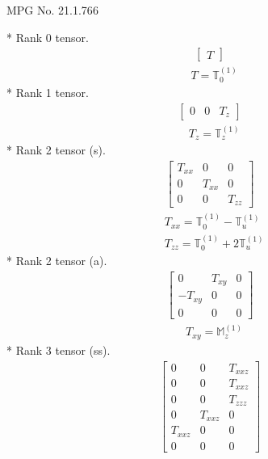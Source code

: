 \documentclass[fleqn,8pt,landscape]{jsarticle}
\begin{document}
\setcounter{MaxMatrixCols}{32}

\renewcommand{\tablename}{Table~}
\renewcommand{\figurename}{Figure~}
\begin{center}
\LARGE
MPG No. 21.1.76\quad$6$
\end{center}
* Rank 0 tensor.
\begin{align*}
\begin{bmatrix} T \end{bmatrix}
\end{align*}
\begin{align*}
& T = \mathbb{T}_{0}^{(1)}
\end{align*}
* Rank 1 tensor.
\begin{align*}
\begin{bmatrix} 0 & 0 & T_{z} \end{bmatrix}
\end{align*}
\begin{align*}
& T_{z} = \mathbb{T}_{z}^{(1)}
\end{align*}
* Rank 2 tensor (s).
\begin{align*}
\begin{bmatrix} T_{xx} & 0 & 0 \\ 0 & T_{xx} & 0 \\ 0 & 0 & T_{zz} \end{bmatrix}
\end{align*}
\begin{align*}
& T_{xx} = \mathbb{T}_{0}^{(1)} - \mathbb{T}_{u}^{(1)} \\
& T_{zz} = \mathbb{T}_{0}^{(1)} + 2 \mathbb{T}_{u}^{(1)}
\end{align*}
* Rank 2 tensor (a).
\begin{align*}
\begin{bmatrix} 0 & T_{xy} & 0 \\ - T_{xy} & 0 & 0 \\ 0 & 0 & 0 \end{bmatrix}
\end{align*}
\begin{align*}
& T_{xy} = \mathbb{M}_{z}^{(1)}
\end{align*}
* Rank 3 tensor (ss).
\begin{align*}
\begin{bmatrix} 0 & 0 & T_{xxz} \\ 0 & 0 & T_{xxz} \\ 0 & 0 & T_{zzz} \\ 0 & T_{xxz} & 0 \\ T_{xxz} & 0 & 0 \\ 0 & 0 & 0 \end{bmatrix}
\end{align*}
\end{document}
